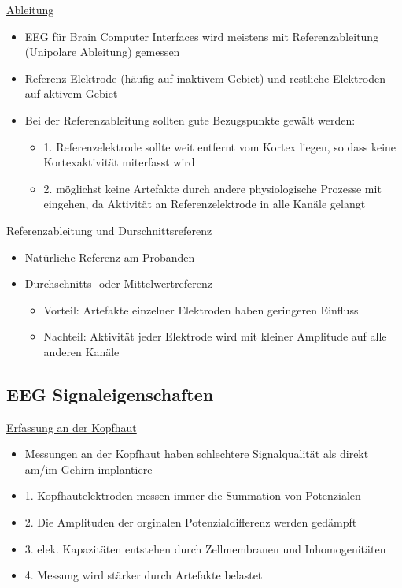 \documentclass[a4paper,10pt,oneside]{article}
\begin{document}
\underline{Ableitung}\\
	\begin{itemize}
		\item EEG für Brain Computer Interfaces wird meistens mit Referenzableitung (Unipolare Ableitung) gemessen 
		\item Referenz-Elektrode (häufig auf inaktivem Gebiet) und restliche Elektroden auf aktivem Gebiet
		\item Bei der Referenzableitung sollten gute Bezugspunkte gewält werden:
			\begin{itemize}
				\item 1. Referenzelektrode sollte weit entfernt vom Kortex liegen, so dass keine Kortexaktivität miterfasst wird
				\item 2. möglichst keine Artefakte durch andere physiologische Prozesse mit eingehen, da Aktivität an Referenzelektrode in alle Kanäle gelangt
			\end{itemize}
	\end{itemize}
	
\underline{Referenzableitung und Durschnittsreferenz} \\
	\begin{itemize}
		\item Natürliche Referenz am Probanden
		\item Durchschnitts- oder Mittelwertreferenz
			\begin{itemize}
				\item Vorteil: Artefakte einzelner Elektroden haben geringeren Einfluss
				\item Nachteil: Aktivität jeder Elektrode wird mit kleiner Amplitude auf alle anderen Kanäle
			\end{itemize}
	\end{itemize}
 		
\subsection{EEG Signaleigenschaften}

\underline{Erfassung an der Kopfhaut} \\
	\begin{itemize}
		\item Messungen an der Kopfhaut haben schlechtere Signalqualität als direkt am/im Gehirn implantiere 
		\item 1. Kopfhautelektroden messen immer die Summation von Potenzialen
		\item 2. Die Amplituden der orginalen Potenzialdifferenz werden gedämpft 
		\item 3. elek. Kapazitäten entstehen durch Zellmembranen und Inhomogenitäten
		\item 4. Messung wird stärker durch Artefakte belastet
	\end{itemize}
	
\end{document}
